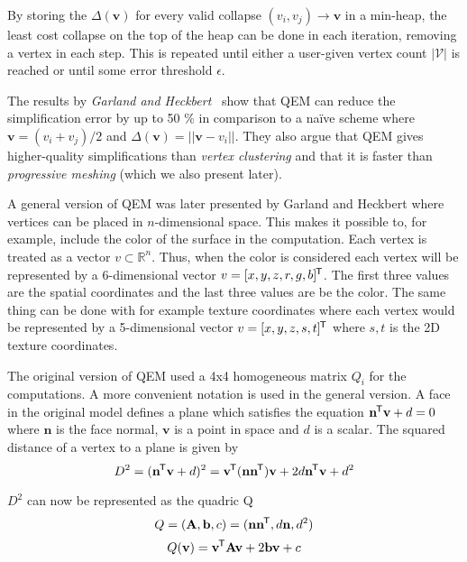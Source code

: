 By storing the \(\Delta(\mathbf{v})\) for every valid collapse \((v_i, v_j) \rightarrow \mathbf{v}\) in a min-heap, the least cost collapse on the top of the heap can be done in each iteration, removing a vertex in each step. This is repeated until either a user-given vertex count \(|\mathcal{V}|\) is reached or until some error threshold \(\epsilon\).

The results by \emph{Garland and Heckbert}~\cite{garland1997surface} show that QEM can reduce the simplification error by up to 50 \% in comparison to a na\"ive scheme where \(\mathbf{v} = (v_i + v_j) / 2\) and \(\Delta(\mathbf{v}) = ||\mathbf{v} - v_i||\). They also argue that QEM gives higher-quality simplifications than \emph{vertex clustering} and that it is faster than \emph{progressive meshing} (which we also present later).


A general version of QEM was later presented by Garland and Heckbert \cite{garland1998simplifying} where vertices can be placed in $n$-dimensional space. This makes it possible to, for example, include the color of the surface in the computation. Each vertex is treated as a vector \(v \subset \mathbb{R}^n\). Thus, when the color is considered each vertex will be represented by a 6-dimensional vector \(v = [x, y, z, r, g, b]^{\mkern-1.5mu\mathsf{T}}\). The first three values are the spatial coordinates and the last three values are be the color. The same thing can be done with for example texture coordinates where each vertex would be represented by a 5-dimensional vector \(v = [x, y, z, s, t]^{\mkern-1.5mu\mathsf{T}}\) where \(s, t\) is the 2D texture coordinates.

The original version of QEM used a 4x4 homogeneous matrix \(Q_i\) for the computations. A more convenient notation is used in the general version. A face in the original model defines a plane which satisfies the equation \(\mathbf{n}^{\mkern-1.5mu\mathsf{T}} \mathbf{v} + d = 0\) where \(\mathbf{n}\) is the face normal, \(\mathbf{v}\) is a point in space and \(d\) is a scalar. The squared distance of a vertex to a plane is given by
\begin{equation}
  D^2 = (\mathbf{n}^{\mkern-1.5mu\mathsf{T}}\mathbf{v} + d)^2 = \mathbf{v}^{\mkern-1.5mu\mathsf{T}}(\mathbf{nn}^{\mkern-1.5mu\mathsf{T}})\mathbf{v} + 2d\mathbf{n}^{\mkern-1.5mu\mathsf{T}}\mathbf{v} + d^2
\end{equation}

$D^2$ can now be represented as the quadric Q
\begin{equation}
  Q = (\mathbf{A}, \mathbf{b}, c) = (\mathbf{nn}^{\mkern-1.5mu\mathsf{T}}, d\mathbf{n}, d^2)
\end{equation}
\begin{equation}
  Q(\mathbf{v}) = \mathbf{v}^{\mkern-1.5mu\mathsf{T}}\mathbf{Av} + 2\mathbf{bv} + c
\end{equation}



